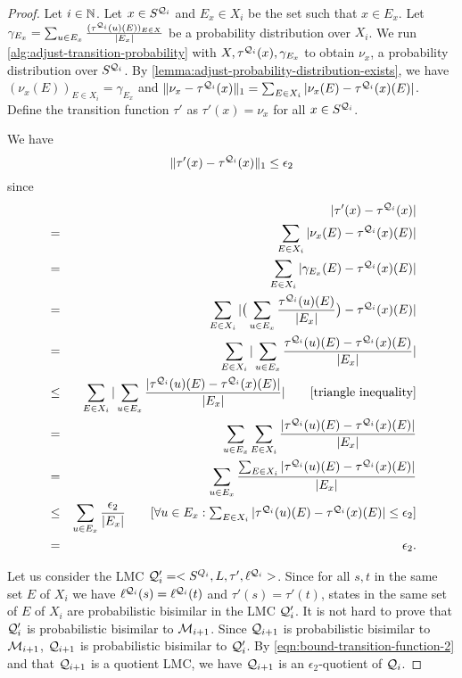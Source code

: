 \begin{proof}
	Let $i \in \mathbb{N}$. Let $x \in S^{\mathcal{Q}_i}$ and $E_x \in  X_i$ be the set such that $x \in E_x$. Let $\gamma_{E_x} = \sum_{u \in  E_x} \frac{(\tau^{\mathcal{Q}_i}(u)(E))_{E \in X}}{|E_x|}$ be a probability distribution over $X_i$. We run \cref{alg:adjust-transition-probability} with $X, \tau^{\mathcal{Q}_i}(x), \gamma_{E_x}$ to obtain $\nu_x$, a probability distribution over $S^{\mathcal{Q}_i}$. By \cref{lemma:adjust-probability-distribution-exists}, we have $(\nu_x(E))_{E \in X_i} = \gamma_{E_x}$ and $\|\nu_x - \tau^{\mathcal{Q}_i}(x)\|_1 = \sum_{E \in X_i} |\nu_x(E) - \tau^{\mathcal{Q}_i}(x)(E)|$. Define the transition function $\tau'$ as $\tau'(x) = \nu_x$ for all $x \in S^{\mathcal{Q}_i}$.
	
	We have  
	\begin{equation}\label{eqn:bound-transition-function-2}
	\|\tau'(x) - \tau^{\mathcal{Q}_i}(x)\|_1 \le \epsilon_2
	\end{equation}
	since 
	\begin{eqnarray*}
		&& |\tau'(x) - \tau^{\mathcal{Q}_i}(x)| \\
		&=& \sum_{E \in X_i}  |\nu_x(E) - \tau^{\mathcal{Q}_i}(x)(E)| \\
		& = & \sum_{E \in X_i} |\gamma_{E_x}(E) - \tau^{\mathcal{Q}_i}(x)(E)|\\
		& = & \sum_{E \in X_i} |\big(\sum_{u \in  E_x} \frac{\tau^{\mathcal{Q}_i}(u)(E)}{|E_x|}\big) - \tau^{\mathcal{Q}_i}(x)(E)|\\
		& = & \sum_{E \in X_i}|\sum_{u \in  E_x} \frac{\tau^{\mathcal{Q}_i}(u)(E) - \tau^{\mathcal{Q}_i}(x)(E)}{|E_x|} | \\
		& \le & 	\sum_{E \in X_i}| \sum_{u \in  E_x} \frac{|\tau^{\mathcal{Q}_i}(u)(E) - \tau^{\mathcal{Q}_i}(x)(E)|}{|E_x|} | \hspace{2em} [\mbox{triangle inequality}]\\
		& = & 	\sum_{u \in  E_x}  \sum_{E \in X_i} \frac{|\tau^{\mathcal{Q}_i}(u)(E) - \tau^{\mathcal{Q}_i}(x)(E)|}{|E_x|} \\
		& = & 	\sum_{u \in  E_x}  \frac{\sum_{E \in X_i} |\tau^{\mathcal{Q}_i}(u)(E) - \tau^{\mathcal{Q}_i}(x)(E)|}{|E_x|} \\
		&\le& \sum_{u \in  E_x} \frac{\epsilon_2}{|E_x|}  \hspace{2em} [\mbox{$\forall u \in E_x: \sum_{E \in X_i}|\tau^{\mathcal{Q}_i}(u)(E) - \tau^{\mathcal{Q}_i}(x)(E)| \le \epsilon_2 $}]\\
		& =& \epsilon_2.
	\end{eqnarray*}

	Let us consider the LMC $\mathcal{Q}_i' = <S^{Q_i}, L, \tau', \ell^{\mathcal{Q}_{i}}>$. Since for all $s, t$ in the same set $E$ of $X_i$ we have $\ell^{\mathcal{Q}_{i}}(s) = \ell^{\mathcal{Q}_{i}}(t)$ and $\tau'(s) = \tau'(t)$, states in the same set of $E$ of $X_i$ are probabilistic bisimilar in the LMC $\mathcal{Q}_i'$. It is not hard to prove that $\mathcal{Q}_i'$ is probabilistic bisimilar to $\mathcal{M}_{i+1}$. Since $\mathcal{Q}_{i+1}$ is probabilistic bisimilar to $\mathcal{M}_{i+1}$, $\mathcal{Q}_{i+1}$ is probabilistic bisimilar to $\mathcal{Q}_{i}'$. By \eqref{eqn:bound-transition-function-2} and that $\mathcal{Q}_{i+1}$ is a quotient LMC, we have $\mathcal{Q}_{i+1}$ is an $\epsilon_2$-quotient of $\mathcal{Q}_i$.
\end{proof}

